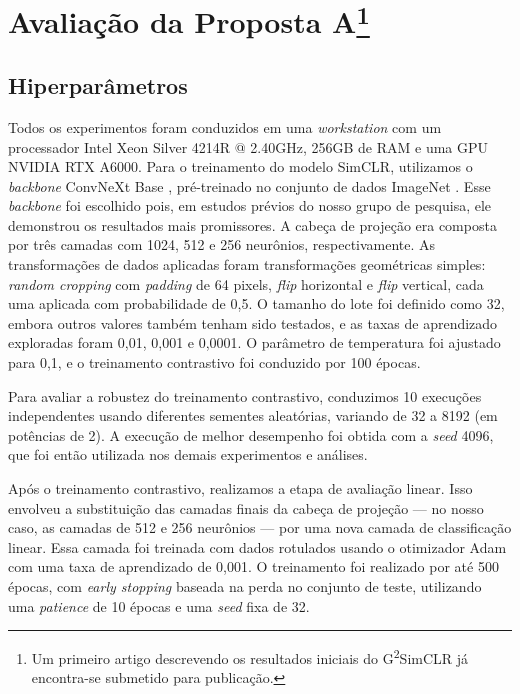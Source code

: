 \section[Avaliação da Proposta A]{Avaliação da Proposta A\footnote{Um primeiro artigo descrevendo os resultados iniciais do G\textsuperscript{2}SimCLR já encontra-se submetido para publicação.}}
\subsection{Hiperparâmetros}

Todos os experimentos foram conduzidos em uma \textit{workstation} com um processador Intel Xeon Silver 4214R @ 2.40GHz, 256GB de RAM e uma GPU NVIDIA RTX A6000. Para o treinamento do modelo SimCLR, utilizamos o \textit{backbone} ConvNeXt Base \cite{convnext}, pré-treinado no conjunto de dados ImageNet \cite{imagenet}. Esse \textit{backbone} foi escolhido pois, em estudos prévios do nosso grupo de pesquisa, ele demonstrou os resultados mais promissores. A cabeça de projeção era composta por três camadas com 1024, 512 e 256 neurônios, respectivamente. As transformações de dados aplicadas foram transformações geométricas simples: \textit{random cropping} com \textit{padding} de 64 pixels, \textit{flip} horizontal e \textit{flip} vertical, cada uma aplicada com probabilidade de 0,5. O tamanho do lote foi definido como 32, embora outros valores também tenham sido testados, e as taxas de aprendizado exploradas foram 0,01, 0,001 e 0,0001. O parâmetro de temperatura foi ajustado para 0,1, e o treinamento contrastivo foi conduzido por 100 épocas.

Para avaliar a robustez do treinamento contrastivo, conduzimos 10 execuções independentes usando diferentes sementes aleatórias, variando de 32 a 8192 (em potências de 2). A execução de melhor desempenho foi obtida com a \textit{seed} 4096, que foi então utilizada nos demais experimentos e análises.

Após o treinamento contrastivo, realizamos a etapa de avaliação linear. Isso envolveu a substituição das camadas finais da cabeça de projeção — no nosso caso, as camadas de 512 e 256 neurônios — por uma nova camada de classificação linear. Essa camada foi treinada com dados rotulados usando o otimizador Adam com uma taxa de aprendizado de 0,001. O treinamento foi realizado por até 500 épocas, com \textit{early stopping} baseada na perda no conjunto de teste, utilizando uma \textit{patience} de 10 épocas e uma \textit{seed} fixa de 32.

